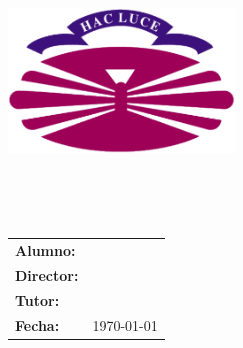 %
%
\begin{titlepage}
	\begin{center}
		\includegraphics[width=6cm]{./eps/logo_udc.eps}
		\vspace{2cm}

		{\Large{\textbf{\centro}}}
		\\
		{\it \large{\textbf{\departamento}}}
		\vspace{1cm}

		{\large {\sc \proyecto}\\{\curso}}
		\vspace{1cm}

		\textbf{\Large \titulogalego}
		\vspace{6cm}
	\end{center}

	\begin{flushright}
		\begin{tabular}{ll}
			\large{\textbf{Alumno:}}	&
			\large{\autor} \\

			\large{\textbf{Director:}}	&
			\large{\director} \\

			\large{\textbf{Tutor:}}		&
			\large{\tutor} \\

			\large{\textbf{Fecha:}}		&
			\large{\today} \\
		\end{tabular}
	\end{flushright}
\end{titlepage}

